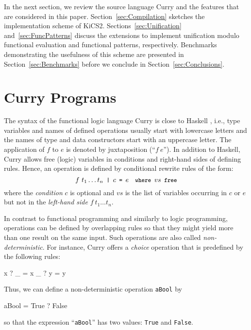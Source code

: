 \documentclass{llncs}
\newcommand{\code}[1]{\mbox{\small\texttt{#1}}}
\newcommand{\ccode}[1]{``\code{#1}''}
\begin{document}
In the next section, we review the source language Curry
and the features that are considered in this paper.
Section~\ref{sec:Compilation} sketches the implementation scheme
of KiCS2.
Sections~\ref{sec:Unification} and~\ref{sec:FuncPatterns}
discuss the extensions to implement unification modulo
functional evaluation and functional patterns, respectively.
Benchmarks demonstrating the usefulness of this scheme
are presented in Section~\ref{sec:Benchmarks}
before we conclude in Section~\ref{sec:Conclusions}.



\section{Curry Programs}
\label{sec:Curry}

The syntax of the functional logic language Curry \cite{Hanus06Curry}
is close to Haskell \cite{PeytonJones03Haskell},
i.e., type variables and names of defined operations usually
start with lowercase letters and the names of type and data constructors
start with an uppercase letter. The application of $f$
to $e$ is denoted by juxtaposition (``$f~e$'').
In addition to Haskell, Curry allows free (logic)
variables in conditions and right-hand sides of defining rules.
Hence, an operation is defined by conditional rewrite rules of the form:
%
\begin{equation}
\label{rule}
f~t_1 \ldots t_n \code{~|~} c \code{~=~} e \code{~~where~} vs \code{~free}
\end{equation}
where the \emph{condition} $c$ is optional and
$vs$ is the list of variables occurring in $c$ or $e$ but not in the
\emph{left-hand side} $f~t_1 \ldots t_n$.

In contrast to functional programming and similarly to logic programming,
operations can be defined by overlapping rules so that
they might yield more than one result on the same input.
Such operations are also called \emph{non-deterministic}.
For instance, Curry offers a \emph{choice} operation that is predefined by
the following rules:
%
\begin{curry}
  x ? _ = x
  _ ? y = y
\end{curry}
%
Thus, we can define a non-deterministic operation \code{aBool} by
\label{ex:aBool}
%
\begin{curry}
  aBool = True ? False
\end{curry}
%
so that the expression \ccode{aBool} has two values:
\code{True} and \code{False}.
\end{document}
